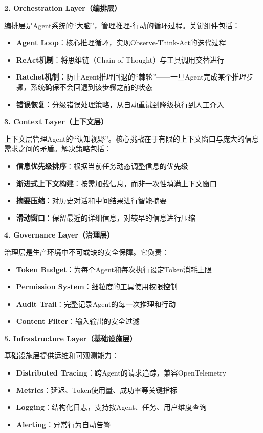 \documentclass[12pt,a4paper]{ctexrep}
\begin{document}
\textbf{2. Orchestration Layer（编排层）}

编排层是Agent系统的``大脑''，管理推理-行动的循环过程。关键组件包括：

\begin{itemize}[leftmargin=2em]
\item \textbf{Agent Loop}：核心推理循环，实现Observe-Think-Act的迭代过程
\item \textbf{ReAct机制}：将思维链（Chain-of-Thought）与工具调用交替进行\cite{react2023}
\item \textbf{Ratchet机制}：防止Agent推理回退的``棘轮''——一旦Agent完成某个推理步骤，系统确保不会回退到该步骤之前的状态
\item \textbf{错误恢复}：分级错误处理策略，从自动重试到降级执行到人工介入
\end{itemize}

\textbf{3. Context Layer（上下文层）}

上下文层管理Agent的``认知视野''。核心挑战在于有限的上下文窗口与庞大的信息需求之间的矛盾。解决策略包括：

\begin{itemize}[leftmargin=2em]
\item \textbf{信息优先级排序}：根据当前任务动态调整信息的优先级
\item \textbf{渐进式上下文构建}：按需加载信息，而非一次性填满上下文窗口
\item \textbf{摘要压缩}：对历史对话和中间结果进行智能摘要
\item \textbf{滑动窗口}：保留最近的详细信息，对较早的信息进行压缩
\end{itemize}

\textbf{4. Governance Layer（治理层）}

治理层是生产环境中不可或缺的安全保障。它负责：

\begin{itemize}[leftmargin=2em]
\item \textbf{Token Budget}：为每个Agent和每次执行设定Token消耗上限
\item \textbf{Permission System}：细粒度的工具使用权限控制
\item \textbf{Audit Trail}：完整记录Agent的每一次推理和行动
\item \textbf{Content Filter}：输入输出的安全过滤
\end{itemize}

\textbf{5. Infrastructure Layer（基础设施层）}

基础设施层提供运维和可观测能力：

\begin{itemize}[leftmargin=2em]
\item \textbf{Distributed Tracing}：跨Agent的请求追踪，兼容OpenTelemetry\cite{opentelemetry2024}
\item \textbf{Metrics}：延迟、Token使用量、成功率等关键指标
\item \textbf{Logging}：结构化日志，支持按Agent、任务、用户维度查询
\item \textbf{Alerting}：异常行为自动告警
\end{itemize}
\end{document}
